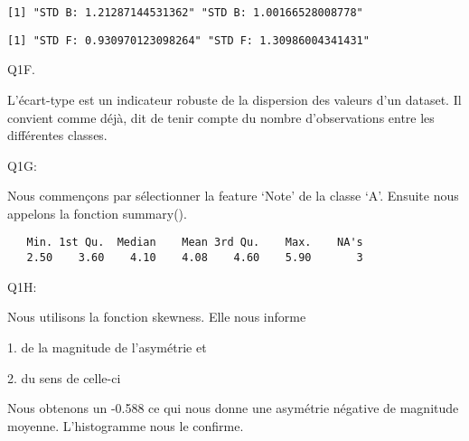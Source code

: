 \documentclass[
  letterpaper,
  DIV=11,
  numbers=noendperiod]{scrartcl}
\newenvironment{Shaded}{}{}
\newcommand{\AttributeTok}[1]{\textcolor[rgb]{0.84,0.23,0.29}{#1}}
\newcommand{\FunctionTok}[1]{\textcolor[rgb]{0.44,0.26,0.76}{#1}}
\newcommand{\NormalTok}[1]{\textcolor[rgb]{0.14,0.16,0.18}{#1}}
\newcommand{\OtherTok}[1]{\textcolor[rgb]{0.44,0.26,0.76}{#1}}
\newcommand{\SpecialCharTok}[1]{\textcolor[rgb]{0.00,0.36,0.77}{#1}}
\newcommand{\StringTok}[1]{\textcolor[rgb]{0.01,0.18,0.38}{#1}}
\begin{document}
\begin{verbatim}
[1] "STD B: 1.21287144531362" "STD B: 1.00166528008778"
\end{verbatim}

\begin{Shaded}
\end{Shaded}

\begin{verbatim}
[1] "STD F: 0.930970123098264" "STD F: 1.30986004341431" 
\end{verbatim}

Q1F.

L'écart-type est un indicateur robuste de la dispersion des valeurs d'un
dataset. Il convient comme déjà, dit de tenir compte du nombre
d'observations entre les différentes classes.

Q1G:

Nous commençons par sélectionner la feature `Note' de la classe `A'.
Ensuite nous appelons la fonction summary().

\begin{Shaded}
\end{Shaded}

\begin{verbatim}
   Min. 1st Qu.  Median    Mean 3rd Qu.    Max.    NA's 
   2.50    3.60    4.10    4.08    4.60    5.90       3 
\end{verbatim}

Q1H:

Nous utilisons la fonction skewness. Elle nous informe

1. de la magnitude de l'asymétrie et

2. du sens de celle-ci

Nous obtenons un -0.588 ce qui nous donne une asymétrie négative de
magnitude moyenne. L'histogramme nous le confirme.
\end{document}
